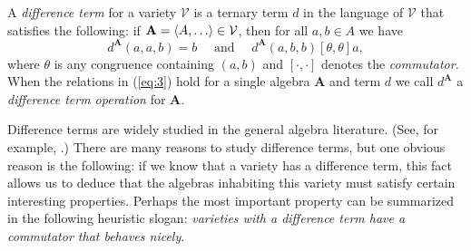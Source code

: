 \documentclass[11pt]{amsart}
\newcommand\alg[1]{\mathbf{#1}}
\newcommand\defn[1]{\textit{#1}}
\newcommand\sV{\mathcal{V}}
\newcommand{\comm}[2]{\ensuremath{[#1, #2]}} %
\newcommand{\malcev}{Maltsev\xspace}
\begin{document}
A \defn{difference term} for a variety $\sV$ is a ternary term $d$ in the language of $\sV$ that satisfies the following:  if $\alg{A} = \<A, \dots \> \in \sV$, then for all $a, b \in A$ we have
  \begin{equation}
  \label{eq:3}
  d^{\alg{A}}(a,a,b) = b \quad \text{ and } \quad
  d^{\alg{A}}(a,b,b) \mathrel{\comm \theta \theta} a,
  \end{equation}
  where $\theta$ is any congruence %
  containing $(a,b)$
  and $[\cdot, \cdot]$ denotes the \defn{commutator}.
  When the relations in (\ref{eq:3}) hold for a single algebra $\alg{A}$ and term $d$ we call $d^{\alg{A}}$
  a \defn{difference term operation} for $\alg{A}$.
  
Difference terms are widely studied in the general algebra literature. (See, for example, \cite{MR3449235,MR1358491,MR1663558,KSW}.) There are many reasons to study difference terms, but
one obvious reason is the following: if we know that a variety has a difference term, this fact allows us to deduce that the algebras inhabiting this variety must satisfy certain interesting properties.  Perhaps the most important property can be summarized in the following heuristic slogan: \emph{varieties with a difference term have a commutator that behaves nicely}.  
  
  
  
\end{document}
